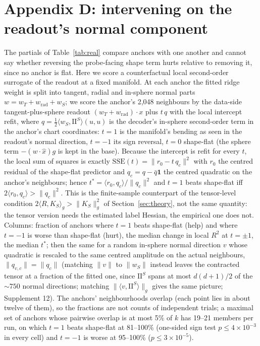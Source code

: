\documentclass{article}
\newcommand{\norm}[1]{\lVert #1 \rVert}
\begin{document}
\section*{Appendix D: intervening on the readout's normal component}
The partials of Table~\ref{tab:real} compare anchors with one another and cannot say whether reversing the probe-facing shape term hurts relative to removing it, since no anchor is flat. Here we score a counterfactual local second-order surrogate of the readout at a fixed manifold. At each anchor the fitted ridge weight is split into tangent, radial and in-sphere normal parts $w = w_T + w_{\mathrm{rad}} + w_S$; we score the anchor's 2{,}048 neighbours by the data-side tangent-plus-sphere readout $(w_T + w_{\mathrm{rad}})\cdot x$ plus $t\,q$ with the local intercept refit, where $q = \tfrac12\langle w_S,\mathrm{II}^S\rangle(u,u)$ is the decoder's in-sphere second-order term in the anchor's chart coordinates: $t=1$ is the manifold's bending as seen in the readout's normal direction, $t=-1$ its sign reversal, $t=0$ shape-flat (the sphere term $-(w\!\cdot\!\hat x)g$ is kept in the base). Because the intercept is refit for every $t$, the local sum of squares is exactly $\mathrm{SSE}(t) = \norm{r_0 - t\,q_c}^2$ with $r_0$ the centred residual of the shape-flat predictor and $q_c = q - \bar q\mathbf 1$ the centred quadratic on the anchor's neighbours; hence $t^{*} = \langle r_0,q_c\rangle/\norm{q_c}^2$ and $t=1$ beats shape-flat iff $2\langle r_0,q_c\rangle > \norm{q_c}^2$. This is the finite-sample counterpart of the tensor-level condition $2\langle R,K_S\rangle_g > \norm{K_S}_g^2$ of Section~\ref{sec:theory}, not the same quantity: the tensor version needs the estimated label Hessian, the empirical one does not. Columns: fraction of anchors where $t=1$ beats shape-flat (help) and where $t=-1$ is worse than shape-flat (hurt), the median change in local $R^2$ at $t=\pm1$, the median $t^{*}$; then the same for a random in-sphere normal direction $v$ whose quadratic is rescaled to the same centred amplitude on the actual neighbours, $\norm{q_{v,c}} = \norm{q_c}$ (matching $\norm{v}$ to $\norm{w_S}$ instead leaves the contracted tensor at a fraction of the fitted one, since $\mathrm{II}^S$ spans at most $d(d+1)/2$ of the $\sim 750$ normal directions; matching $\norm{\langle v,\mathrm{II}^S\rangle}_g$ gives the same picture; Supplement 12). The anchors' neighbourhoods overlap (each point lies in about twelve of them), so the fractions are not counts of independent trials; a maximal set of anchors whose pairwise overlap is at most 5\% of $k$ has 19--21 members per run, on which $t=1$ beats shape-flat at 81--100\% (one-sided sign test $p \le 4\times 10^{-3}$ in every cell) and $t=-1$ is worse at 95--100\% ($p \le 3\times 10^{-5}$).
\end{document}

